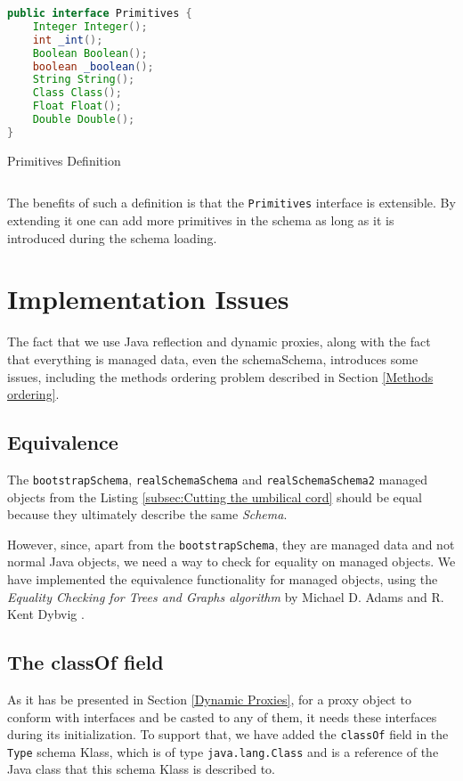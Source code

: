 \begin{sourcecode} [H]
	\begin{lstlisting}[language=Java, escapechar=|]
public interface Primitives {
	Integer Integer();
	int _int();
	Boolean Boolean();
	boolean _boolean();
	String String();
	Class Class();
	Float Float();
	Double Double();
}
	\end{lstlisting}
	\caption{Primitives Definition}
	\label{lst:Primitives Definition}
\end{sourcecode}

The benefits of such a definition is that the \texttt{Primitives} interface is extensible.
By extending it one can add more primitives in the schema as long as it is introduced during the schema loading.

\section{Implementation Issues}\label{Implementation Issues}
The fact that we use Java reflection and dynamic proxies, along with the fact that everything is managed data, even the schemaSchema, introduces some issues, including the methods ordering problem described in Section \ref{Methods ordering}.

\subsection{Equivalence}\label{Managed Object equivalence}
The \texttt{bootstrapSchema}, \texttt{realSchemaSchema} and \texttt{realSchemaSchema2} managed objects from the Listing \ref{subsec:Cutting the umbilical cord} should be equal because they ultimately describe the same \textit{Schema}.

However, since, apart from the \texttt{bootstrapSchema}, they are managed data and not normal Java objects, we need a way to check for equality on managed objects.
We have implemented the equivalence functionality for managed objects, using the \textit{Equality Checking for Trees and Graphs
algorithm} by Michael D. Adams and R. Kent Dybvig \cite{adams2008efficient}.

\subsection{The classOf field}\label{The classOf field}
As it has be presented in Section \ref{Dynamic Proxies}, for a proxy object to conform with interfaces and be casted to any of them, it needs these interfaces during its initialization.
To support that, we have added the \texttt{classOf} field in the \texttt{Type} schema Klass, which is of type \texttt{java.lang.Class} and is a reference of the Java class that this schema Klass is described to.

